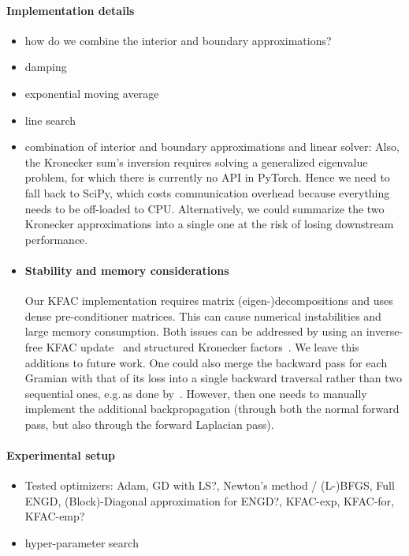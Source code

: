 \paragraph{Implementation details}
\begin{itemize}
    \item how do we combine the interior and boundary approximations?
    \item damping
    \item exponential moving average
    \item line search
    \item combination of interior and boundary approximations and linear solver: Also, the Kronecker sum's inversion requires solving a generalized eigenvalue problem, for which there is currently no API in PyTorch.
    Hence we need to fall back to SciPy, which costs communication overhead because everything needs to be off-loaded to CPU.
    Alternatively, we could summarize the two Kronecker approximations into a single one at the risk of losing downstream performance.
    \item \paragraph{Stability and memory considerations}
    Our KFAC implementation requires matrix (eigen-)decompositions and uses dense pre-conditioner matrices.
    This can cause numerical instabilities and large memory consumption.
    Both issues can be addressed by using an inverse-free KFAC update~\citep{lin2023simplifying} and structured Kronecker factors~\citep{lin2023structured}.
    We leave this additions to future work.
    One could also merge the backward pass for each Gramian with that of its loss into a single backward traversal rather than two sequential ones, e.g.\,as done by~\cite{dangel2020backpack}.
    However, then one needs to manually implement the additional backpropagation (through both the normal forward pass, but also through the forward Laplacian pass).
\end{itemize}





\paragraph{Experimental setup}
\begin{itemize}
    \item Tested optimizers: Adam, GD with LS?, Newton's method / (L-)BFGS, Full ENGD, (Block)-Diagonal approximation for ENGD?, KFAC-exp, KFAC-for, KFAC-emp? %
    \item hyper-parameter search
\end{itemize}

